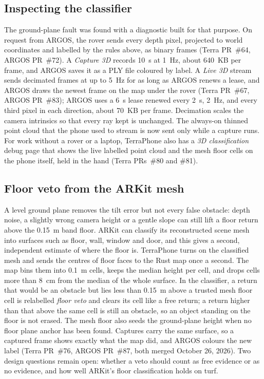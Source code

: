 \subsection{Inspecting the classifier}
\label{sec:auto-capture}

The ground-plane fault was found with a diagnostic built for that purpose.
On request from ARGOS, the rover sends every depth pixel, projected to world coordinates and labelled by the rules above, as binary frames (Terra PR~\#64, ARGOS PR~\#72).
A \emph{Capture 3D} records 10~s at 1~Hz, about 640~KB per frame, and ARGOS saves it as a PLY file coloured by label.
A \emph{Live 3D} stream sends decimated frames at up to 5~Hz for as long as ARGOS renews a lease, and ARGOS draws the newest frame on the map under the rover (Terra PR~\#67, ARGOS PR~\#83); ARGOS uses a 6~s lease renewed every 2~s, 2~Hz, and every third pixel in each direction, about 70~KB per frame.
Decimation scales the camera intrinsics so that every ray kept is unchanged.
The always-on thinned point cloud that the phone used to stream is now sent only while a capture runs.
For work without a rover or a laptop, TerraPhone also has a \emph{3D classification} debug page that shows the live labelled point cloud and the mesh floor cells on the phone itself, held in the hand (Terra PRs~\#80 and \#81).

\subsection{Floor veto from the ARKit mesh}
\label{sec:auto-floor-veto}

A level ground plane removes the tilt error but not every false obstacle: depth noise, a slightly wrong camera height or a gentle slope can still lift a floor return above the 0.15~m band floor.
ARKit can classify its reconstructed scene mesh into surfaces such as floor, wall, window and door, and this gives a second, independent estimate of where the floor is.
TerraPhone turns on the classified mesh and sends the centres of floor faces to the Rust map once a second.
The map bins them into 0.1~m cells, keeps the median height per cell, and drops cells more than 8~cm from the median of the whole surface.
In the classifier, a return that would be an obstacle but lies less than 0.15~m above a trusted mesh floor cell is relabelled \emph{floor veto} and clears its cell like a free return; a return higher than that above the same cell is still an obstacle, so an object standing on the floor is not erased.
The mesh floor also seeds the ground-plane height when no floor plane anchor has been found.
Captures carry the same surface, so a captured frame shows exactly what the map did, and ARGOS colours the new label (Terra PR~\#76, ARGOS PR~\#87, both merged October 26, 2026).
Two design questions remain open: whether a veto should count as free evidence or as no evidence, and how well ARKit's floor classification holds on turf.

